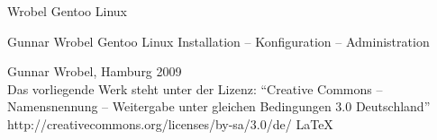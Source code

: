 \schmutztitel%
{Wrobel}
{Gentoo Linux}



\haupttitel%
{Gunnar Wrobel}
{Gentoo Linux}
{Installation -- Konfiguration -- Administration}




\impressum%
{Gunnar Wrobel, Hamburg 2009\\
Das vorliegende Werk steht unter der Lizenz: "`Creative Commons -- Namensnennung -- Weitergabe unter gleichen Bedingungen 3.0 Deutschland"'\\
http://creativecommons.org/licenses/by-sa/3.0/de/} 
{\LaTeX}

\ospvacat


